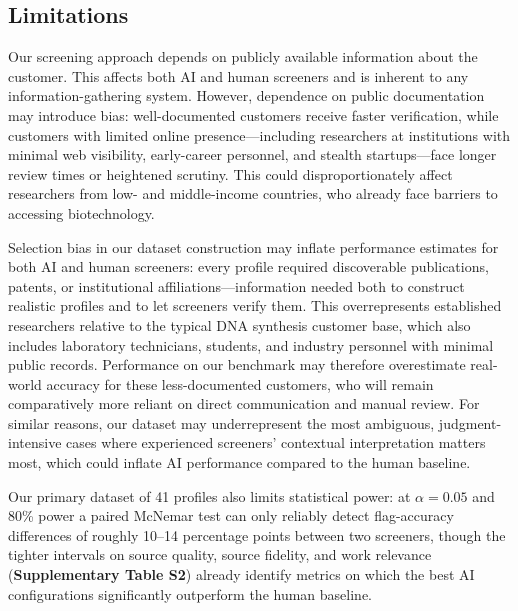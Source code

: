\documentclass[12pt]{article}
\begin{document}
\subsection{Limitations}

Our screening approach depends on publicly available information about the customer. This affects both AI and human screeners and is inherent to any information-gathering system. However, dependence on public documentation may introduce bias: well-documented customers receive faster verification, while customers with limited online presence—including researchers at institutions with minimal web visibility, early-career personnel, and stealth startups—face longer review times or heightened scrutiny. This could disproportionately affect researchers from low- and middle-income countries, who already face barriers to accessing biotechnology.

Selection bias in our dataset construction may inflate performance estimates for both AI and human screeners: every profile required discoverable publications, patents, or institutional affiliations—information needed both to construct realistic profiles and to let screeners verify them. This overrepresents established researchers relative to the typical DNA synthesis customer base, which also includes laboratory technicians, students, and industry personnel with minimal public records. Performance on our benchmark may therefore overestimate real-world accuracy for these less-documented customers, who will remain comparatively more reliant on direct communication and manual review. For similar reasons, our dataset may underrepresent the most ambiguous, judgment-intensive cases where experienced screeners' contextual interpretation matters most, which could inflate AI performance compared to the human baseline.

Our primary dataset of 41 profiles also limits statistical power: at $\alpha = 0.05$ and 80\% power a paired McNemar test can only reliably detect flag-accuracy differences of roughly 10--14 percentage points between two screeners, though the tighter intervals on source quality, source fidelity, and work relevance (\textbf{Supplementary Table S2}) already identify metrics on which the best AI configurations significantly outperform the human baseline.
\end{document}
